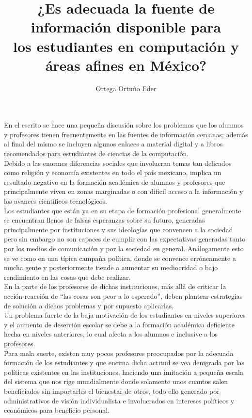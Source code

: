\documentclass{article}
\title{¿Es adecuada la fuente de información disponible para \\los estudiantes en computación y áreas afines en México?}
\author{Ortega Ortu\~no Eder}
\date{} %
\begin{document}
	\maketitle
	\normalsize{
En el escrito se hace una pequeña discusión sobre los problemas que los alumnos y profesores tienen frecuentemente en las fuentes de información cercanas; además al final del mismo se incluyen algunos enlaces a material digital y a libros recomendados para estudiantes de ciencias de la computación.
\\

Debido a las enormes diferencias sociales que involucran temas tan delicados como religión y economía existentes en todo el país mexicano, implica un resultado negativo en la formación académica de alumnos y profesores que principalmente viven en zonas marginadas o con dificil acceso a la información y los avances científicos-tecnológicos.
\\

Los estudiantes que están ya en su etapa de formación profesional generalmente se encuentran llenos de falsas esperanzas sobre su futuro, generadas principalmente por instituciones y sus ideologías que convencen a la sociedad pero sin embargo no son capaces de cumplir con las expectativas generadas tanto por los medios de comunicación y por la sociedad en general. Análogamente esto se ve como en una típica campaña política, donde se convence erróneamente a mucha gente y posteriormente tiende a aumentar su mediocridad o bajo rendimiento en las cosas que debe realizar.
\\

En la parte de los profesores de dichas instituciones, más allá de criticar la acción-reacción de “las cosas son peor a lo esperado”, deben plantear estrategias de solución a dichos problemas y por supuesto aplicarlas.
\\

Un problema fuerte de la baja motivación de los estudiantes en niveles superiores y el aumento de deserción escolar se debe a la formación académica deficiente hecha en niveles anteriores, lo cual afecta a los alumnos e inclusive a los profesores.
\\

Para mala suerte, existen muy pocos profesores preocupados por la adecuada formación de los estudiantes y que encima dicha actitud se vea denigrada por las políticas existentes en las instituciones, haciendo una imitación a pequeña escala del sistema que nos rige mundialmente donde solamente unos cuantos salen beneficiados sin importarles el bienestar de otros, todo ello generado por administrativos de visión individualista e involucrados en intereses políticos y económicos para beneficio personal.
\\

}
\end{document}
